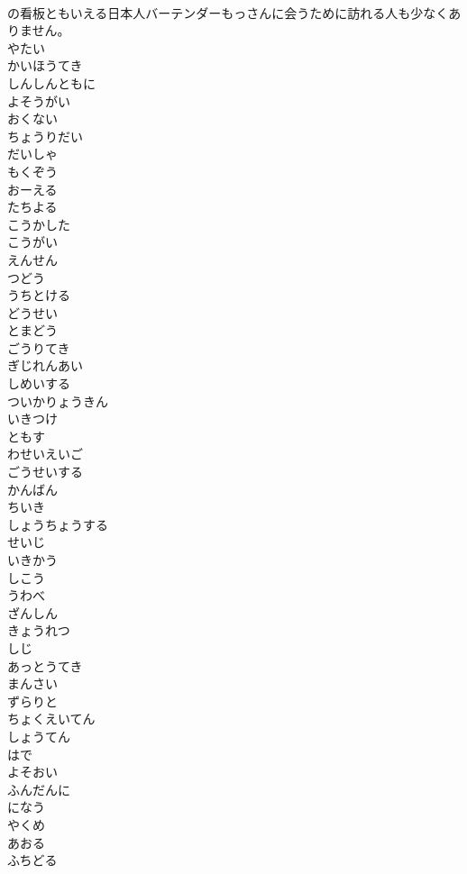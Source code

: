 \documentclass[8pt]{extreport}
\begin{document}
\begin{CJK}{UTF8}{min}
\\	の看板ともいえる日本人バーテンダーもっさんに会うために訪れる人も少なくありません。 
\\	やたい
\\	かいほうてき
\\	しんしんともに
\\	よそうがい
\\	おくない
\\	ちょうりだい
\\	だいしゃ
\\	もくぞう
\\	おーえる
\\	たちよる
\\	こうかした
\\	こうがい
\\	えんせん
\\	つどう
\\	うちとける
\\	どうせい
\\	とまどう
\\	ごうりてき
\\	ぎじれんあい
\\	しめいする
\\	ついかりょうきん
\\	いきつけ
\\	ともす
\\	わせいえいご
\\	ごうせいする
\\	かんばん
\\	ちいき
\\	しょうちょうする
\\	せいじ
\\	いきかう
\\	しこう
\\	うわべ
\\	ざんしん
\\	きょうれつ
\\	しじ
\\	あっとうてき
\\	まんさい
\\	ずらりと
\\	ちょくえいてん
\\	しょうてん
\\	はで
\\	よそおい
\\	ふんだんに
\\	になう
\\	やくめ
\\	あおる
\\	ふちどる

\end{CJK}
\end{document}
